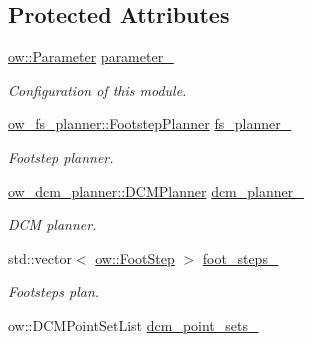 \subsection*{Protected Attributes}
\begin{DoxyCompactItemize}
\item 
\hyperlink{classow_1_1Parameter}{ow\+::\+Parameter} \hyperlink{classow__planner_1_1WalkingPlanner_a380c610ffc6a06b93eed662bbcea89dd}{parameter\+\_\+}\hypertarget{classow__planner_1_1WalkingPlanner_a380c610ffc6a06b93eed662bbcea89dd}{}\label{classow__planner_1_1WalkingPlanner_a380c610ffc6a06b93eed662bbcea89dd}

\begin{DoxyCompactList}\small\item\em Configuration of this module. \end{DoxyCompactList}\item 
\hyperlink{classow__fs__planner_1_1FootstepPlanner}{ow\+\_\+fs\+\_\+planner\+::\+Footstep\+Planner} \hyperlink{classow__planner_1_1WalkingPlanner_aa7758005946e087b998a2f007fe330cf}{fs\+\_\+planner\+\_\+}\hypertarget{classow__planner_1_1WalkingPlanner_aa7758005946e087b998a2f007fe330cf}{}\label{classow__planner_1_1WalkingPlanner_aa7758005946e087b998a2f007fe330cf}

\begin{DoxyCompactList}\small\item\em Footstep planner. \end{DoxyCompactList}\item 
\hyperlink{classow__dcm__planner_1_1DCMPlanner}{ow\+\_\+dcm\+\_\+planner\+::\+D\+C\+M\+Planner} \hyperlink{classow__planner_1_1WalkingPlanner_a0453bc45c6c813d2cad9b4a9f3f88481}{dcm\+\_\+planner\+\_\+}\hypertarget{classow__planner_1_1WalkingPlanner_a0453bc45c6c813d2cad9b4a9f3f88481}{}\label{classow__planner_1_1WalkingPlanner_a0453bc45c6c813d2cad9b4a9f3f88481}

\begin{DoxyCompactList}\small\item\em D\+CM planner. \end{DoxyCompactList}\item 
std\+::vector$<$ \hyperlink{classow__core_1_1FootStep}{ow\+::\+Foot\+Step} $>$ \hyperlink{classow__planner_1_1WalkingPlanner_a80d1477d60220d6c0b69169d7be15491}{foot\+\_\+steps\+\_\+}\hypertarget{classow__planner_1_1WalkingPlanner_a80d1477d60220d6c0b69169d7be15491}{}\label{classow__planner_1_1WalkingPlanner_a80d1477d60220d6c0b69169d7be15491}

\begin{DoxyCompactList}\small\item\em Footsteps plan. \end{DoxyCompactList}\item 
ow\+::\+D\+C\+M\+Point\+Set\+List \hyperlink{classow__planner_1_1WalkingPlanner_a635d47e861a010e63e3beb257d76493f}{dcm\+\_\+point\+\_\+sets\+\_\+}\hypertarget{classow__planner_1_1WalkingPlanner_a635d47e861a010e63e3beb257d76493f}{}\label{classow__planner_1_1WalkingPlanner_a635d47e861a010e63e3beb257d76493f}


\end{DoxyCompactItemize}
